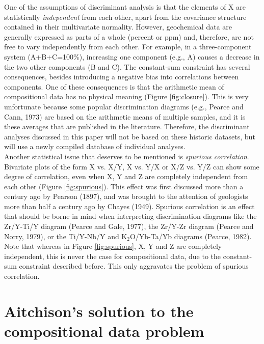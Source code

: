 \documentclass{article}
\begin{document}
One of the  assumptions of discriminant analysis is  that the elements
of X are  statistically {\it independent} from each  other, apart from
the  covariance structure contained  in their  multivariate normality.
However, geochemical data are generally  expressed as parts of a whole
(percent or  ppm) and, therefore,  are not free to  vary independently
from   each  other.    For  example,   in  a   three-component  system
(A+B+C=100\%), increasing one component (e.g., A) causes a decrease in
the two other  components (B and C).  The  constant-sum constraint has
several  consequences,  besides   introducing  a  negative  bias  into
correlations between  components.  One  of these consequences  is that
the  arithmetic mean  of compositional  data has  no  physical meaning
(Figure  \ref{fig:closure}).  This  is very  unfortunate  because some
popular  discrimination diagrams  (e.g.,  Pearce and  Cann, 1973)  are
based on  the arithmetic  means of multiple  samples, and it  is these
averages  that  are  published  in  the  literature.   Therefore,  the
discriminant analyses  discussed in  this paper will  not be  based on
these historic  datasets, but  will use a  newly compiled  database of
individual analyses.\\



Another  statistical  issue that  deserves  to  be  mentioned is  {\it
spurious  correlation}.  Bivariate  plots of  the form  X vs.   X/Y, X
vs. Y/X or X/Z vs. Y/Z  can show some degree of correlation, even when
X,  Y  and  Z  are  completely independent  from  each  other  (Figure
\ref{fig:spurious}).   This effect  was  first discussed  more than  a
century ago  by Pearson  (1897), and was  brought to the  attention of
geologists more  than half a  century ago by Chayes  (1949).  Spurious
correlation  is  an   effect  that  should  be  borne   in  mind  when
interpreting  discrimination  diagrams   like  the  Zr/Y-Ti/Y  diagram
(Pearce and Gale, 1977), the Zr/Y-Zr diagram (Pearce and Norry, 1979),
or  the Ti/Y-Nb/Y  and K$_2$O/Yb-Ta/Yb  diagrams (Pearce,  1982). Note
that whereas in  Figure \ref{fig:spurious}, X, Y and  Z are completely
independent, this is never the case for compositional data, due to the
constant-sum  constraint described before.   This only  aggravates the
problem of spurious correlation.

\section{Aitchison's solution to the compositional data problem}
\label{sec:aitchison}
\end{document}
